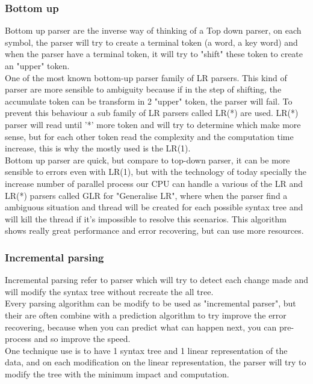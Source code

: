 \subsubsection{Bottom up}
Bottom up parser are the inverse way of thinking of a Top down parser, on each symbol, the parser will try to create a terminal token (a word, a key word) and when the parser have a terminal token, it will try to "shift" these token to create an "upper" token\cite{knuth1971top}\cite{grune2008parsing}.
\\One of the most known bottom-up parser family of LR parsers. This kind of parser are more sensible to ambiguity because if in the step of shifting, the accumulate token can be transform in 2 "upper" token, the parser will fail. To prevent this behaviour a sub family of LR parsers called LR(*) are used. LR(*) parser will read until '*' more token and will try to determine which make more sense, but for each other token read the complexity and the computation time increase, this is why the mostly used is the LR(1).
\\Bottom up parser are quick, but compare to top-down parser, it can be more sensible to errors even with LR(1), but with the technology of today specially the increase number of parallel process our CPU can handle a various of the LR and LR(*) parsers called GLR for "Generalise LR", where when the parser find a ambiguous situation and thread will be created for each possible syntax tree\cite{panopticoncentral_2009} and will kill the thread if it's impossible to resolve this scenarios. This algorithm shows really great performance and error recovering, but can use more resources.
\subsubsection{Incremental parsing}
Incremental parsing refer to parser which will try to detect each change made and will modify the syntax tree without recreate the all tree.\cite{grune2008parsing}\cite{horspool1990incremental}
\\Every parsing algorithm can be modify to be used as "incremental parser", but their are often combine with a prediction algorithm to try improve the error recovering, because when you can predict what can happen next, you can pre-process and so improve the speed.
\\One technique use is to have 1 syntax tree and 1 linear representation of the data, and on each modification on the linear representation, the parser will try to modify the tree with the minimum impact and computation.
